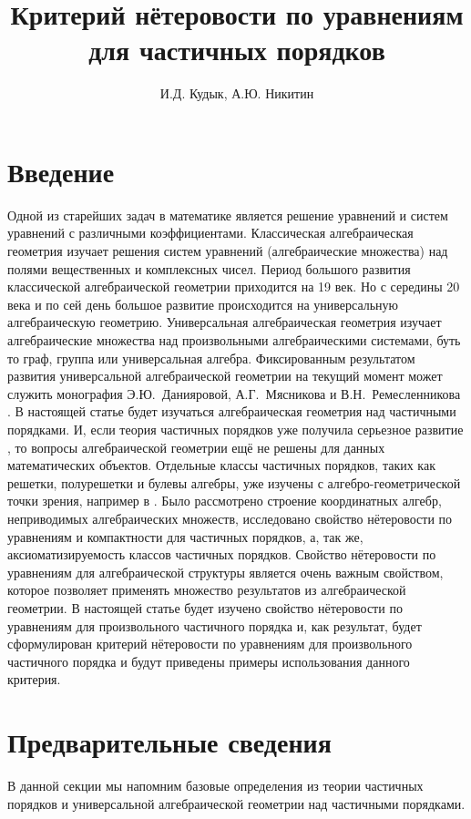 \documentclass[12pt]{article}
\title{Критерий нётеровости по уравнениям для частичных порядков}
\author{И.Д. Кудык, А.Ю. Никитин}
\theoremstyle{break}
\begin{document}
    \maketitle %
    \thispagestyle{empty} %
    \tableofcontents %
    \newpage
    
    \section{Введение}
    Одной из старейших задач в математике является решение уравнений и систем уравнений с различными коэффициентами. Классическая алгебраическая геометрия изучает решения систем уравнений (алгебраические множества) над полями вещественных и комплексных чисел. Период большого развития классической алгебраической геометрии приходится на 19 век. Но с середины 20 века и по сей день большое развитие происходится на универсальную алгебраическую геометрию. Универсальная алгебраическая геометрия изучает алгебраические множества над произвольными алгебраическими системами, буть то граф, группа или универсальная алгебра. Фиксированным результатом развития универсальной алгебраической геометрии на текущий момент может служить монография Э.Ю.~Данияровой, А.Г.~Мясникова и В.Н.~Ремесленникова \cite{AlgGeom}. В настоящей статье будет изучаться алгебраическая геометрия над частичными порядками. И, если теория частичных порядков уже получила серьезное развитие \cite{Gretzer}, то вопросы алгебраической геометрии ещё не решены для данных математических объектов. Отдельные классы частичных порядков, таких как решетки, полурешетки и булевы алгебры, уже изучены с алгебро-геометрической точки зрения, например в \cite{Semilattice}. Было рассмотрено строение координатных алгебр, неприводимых алгебраических множеств, исследовано свойство нётеровости по уравнениям и компактности для частичных порядков, а, так же, аксиоматизируемость классов частичных порядков. Свойство нётеровости по уравнениям для алгебраической структуры является очень важным свойством, которое позволяет применять множество результатов из алгебраической геометрии. В настоящей статье будет изучено свойство нётеровости по уравнениям для произвольного частичного порядка и, как результат, будет сформулирован критерий нётеровости по уравнениям для произвольного частичного порядка и будут приведены примеры использования данного критерия.

	\section{Предварительные сведения}
		В данной секции мы напомним базовые определения из теории частичных порядков и универсальной алгебраической геометрии над частичными порядками.
			
\end{document}
